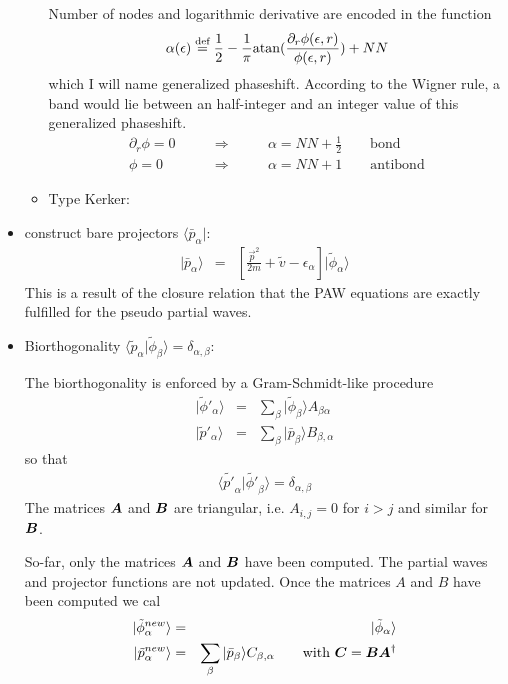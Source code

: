 \documentclass[11pt,a4paper]{report}
\begin{document}
\begin{itemize}
\begin{itemize}
Number of nodes and logarithmic derivative are encoded in the function
\begin{eqnarray*}
\alpha(\epsilon)\stackrel{\text{def}}{=}
\frac{1}{2}-\frac{1}{\pi}
{\rm atan}(\frac{\partial_r\phi(\epsilon,r)}{\phi(\epsilon,r)})+NN
\end{eqnarray*}
which I will name generalized phaseshift.  According to the Wigner
rule, a band would lie between an half-integer and an integer value of
this generalized phaseshift. 
\begin{eqnarray*}
\partial_r\phi=0&\qquad\Rightarrow\qquad&\alpha= NN+\frac{1}{2}\qquad\text{bond}
\\
\phi=0&\qquad\Rightarrow\qquad&\alpha=NN+1\qquad\text{antibond}
\end{eqnarray*}


\item Type Kerker:
\end{itemize}
\item construct bare projectors $\langle\bar{p}_\alpha|$:
\begin{eqnarray*}
|\bar{p}_\alpha\rangle
&=&\left[\frac{\vec{p}^2}{2m}+\tilde{v}-\epsilon_\alpha\right]
|\tilde{\phi}_\alpha\rangle
\end{eqnarray*}
This is a result of the closure relation that the PAW equations are
exactly fulfilled for the pseudo partial waves.
\item Biorthogonality
  $\langle\tilde{p}_\alpha|\tilde{\phi}_\beta\rangle=\delta_{\alpha,\beta}$:

The biorthogonality is enforced by a Gram-Schmidt-like procedure
\begin{eqnarray*}
|\tilde{\phi}'_\alpha\rangle&=&\sum_\beta |\tilde{\phi}_\beta\rangle A_{\beta\alpha}
\\
|\tilde{p}'_\alpha\rangle&=&\sum_\beta |\bar{p}_\beta\rangle B_{\beta,\alpha}
\end{eqnarray*}
so that 
\begin{eqnarray*}
\langle\tilde{p'}_\alpha|\tilde{\phi'}_\beta\rangle=\delta_{\alpha,\beta}
\end{eqnarray*}
The matrices $\bm{A}$ and $\bm{B}$ are triangular, i.e. $A_{i,j}=0$
for $i>j$ and similar for $\bm{B}$.

So-far, only the matrices $\bm{A}$ and $\bm{B}$ have been computed. The partial waves and
projector functions are not updated.  
Once the matrices $A$ and $B$ have been computed we cal
\begin{eqnarray*}
|\tilde{\phi}^{new}_\alpha\rangle&=&|\tilde{\phi}_\alpha\rangle
\\
|\tilde{p}^{new}_\alpha\rangle&=&\sum_\beta |\bar{p}_\beta\rangle C_{\beta,\alpha}
\qquad\text{with $\bm{C}=\bm{B}\bm{A}^{\dagger}$}
\end{eqnarray*}



\end{itemize}
\end{document}
